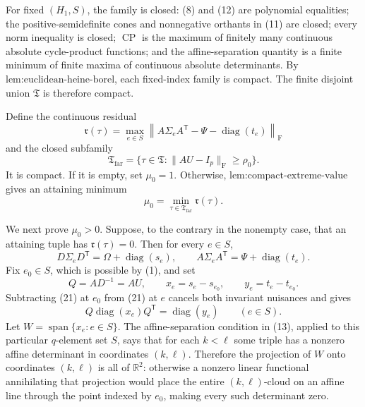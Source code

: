 For fixed \((H_1,S)\), the family is closed: (8) and (12) are polynomial equalities; the positive-semidefinite cones and nonnegative orthants in (11) are closed; every norm inequality is closed; \(\operatorname{CP}\) is the maximum of finitely many continuous absolute cycle-product functions; and the affine-separation quantity is a finite minimum of finite maxima of continuous absolute determinants. By \(\text{lem:euclidean-heine-borel}\), each fixed-index family is compact. The finite disjoint union \(\mathfrak T\) is therefore compact.

Define the continuous residual
\[
\mathfrak r(\tau)=
\max_{e\in S}
\left\|A\Sigma_eA^{\mathsf T}
-\Psi-\operatorname{diag}(t_e)\right\|_{\mathrm F}
\tag{18}
\]
and the closed subfamily
\[
\mathfrak T_{\mathrm{far}}
=\{\tau\in\mathfrak T:\|AU-I_p\|_{\mathrm F}\geq\rho_0\}.
\tag{19}
\]
It is compact. If it is empty, set \(\mu_0=1\). Otherwise, \(\text{lem:compact-extreme-value}\) gives an attaining minimum
\[
\mu_0=\min_{\tau\in\mathfrak T_{\mathrm{far}}}\mathfrak r(\tau).
\tag{20}
\]

We next prove \(\mu_0>0\). Suppose, to the contrary in the nonempty case, that an attaining tuple has \(\mathfrak r(\tau)=0\). Then for every \(e\in S\),
\[
D\Sigma_eD^{\mathsf T}=\Omega+\operatorname{diag}(s_e),
\qquad
A\Sigma_eA^{\mathsf T}=\Psi+\operatorname{diag}(t_e).
\tag{21}
\]
Fix \(e_0\in S\), which is possible by (1), and set
\[
Q=AD^{-1}=AU,
\qquad
x_e=s_e-s_{e_0},
\qquad
y_e=t_e-t_{e_0}.
\]
Subtracting (21) at \(e_0\) from (21) at \(e\) cancels both invariant nuisances and gives
\[
Q\operatorname{diag}(x_e)Q^{\mathsf T}
=\operatorname{diag}(y_e)
\qquad(e\in S).
\tag{22}
\]
Let \(W=\operatorname{span}\{x_e:e\in S\}\). The affine-separation condition in (13), applied to this particular \(q\)-element set \(S\), says that for each \(k<\ell\) some triple has a nonzero affine determinant in coordinates \((k,\ell)\). Therefore the projection of \(W\) onto coordinates \((k,\ell)\) is all of \(\mathbb R^2\): otherwise a nonzero linear functional annihilating that projection would place the entire \((k,\ell)\)-cloud on an affine line through the point indexed by \(e_0\), making every such determinant zero.

